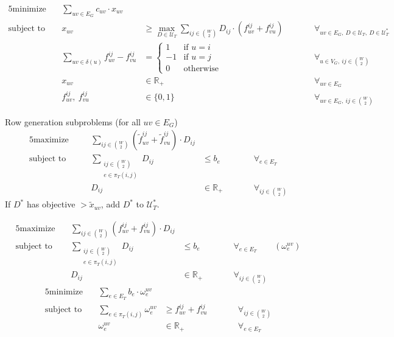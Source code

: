 \begin{alignat*}{5}
    \text{minimize}\ && \sum_{uv \in E_G} c_{uv} \cdot x_{uv} &&& \\
    \text{subject to}\ && x_{uv} &\ge \max_{D \in \mathcal U_T} \sum_{ij \in \binom{W}{2}} D_{ij} \cdot (f_{uv}^{ij} + f_{vu}^{ij}) &&\qquad \forall_{uv \in E_G,\ D \in \mathcal U_T,\ D \in \mathcal U^*_T} \\
    && \sum_{uv \in \delta(u)} f_{uv}^{ij} - f_{vu}^{ij} &= \begin{cases}
                                                                1 & \text{if $u = i$} \\
                                                                -1 & \text{if $u = j$} \\
                                                                0 & \text{otherwise}
    \end{cases} &&\qquad \forall_{u \in V_G,\ ij \in \binom{W}{2}} \\
    && x_{uv} &\in \mathbb{R}_+ &&\qquad \forall_{uv \in E_G} \\
    && f_{uv}^{ij},\ f_{vu}^{ij} &\in \{ 0, 1 \} &&\qquad \forall_{uv \in E_G,\ ij \in \binom{W}{2}}
\end{alignat*}%


Row generation subproblems (for all $uv \in E_G$)
            \begin{alignat*}{5}
                \text{maximize}\quad && \sum_{ij \in \binom{W}{2}} (\tilde f_{uv}^{ij} + \tilde f_{vu}^{ij}) \cdot D_{ij} &&& \\
                \text{subject to}\quad && \sum_{\substack{ij \in \binom{W}{2}\\e \in \pi_T(i,j)}} D_{ij} &\le b_e &&\qquad \forall_{e \in E_T} \\
                && D_{ij} &\in \mathbb{R}_+ &&\qquad \forall_{ij \in \binom{W}{2}}
            \end{alignat*}
            If $D^*$ has objective $> \tilde x_{uv}$, add $D^*$ to $\mathcal U_T^*$.

\begin{alignat*}{5}
    \text{maximize}\ && \sum_{ij \in \binom{W}{2}} (f_{uv}^{ij} + f_{vu}^{ij}) \cdot D_{ij} &&& \\
    \text{subject to}\ && \sum_{\substack{ij \in \binom{W}{2}\\e \in \pi_T(i,j)}} D_{ij} &\le b_e &&\qquad \forall_{e \in E_T} \qquad (\omega_e^{uv}) \\
    && D_{ij} &\in \mathbb{R}_+ &&\qquad \forall_{ij \in \binom{W}{2}}
\end{alignat*}
\hrulefill
\begin{alignat*}{5}
    \text{minimize}\ && \sum_{e \in E_T} b_e \cdot \omega_e^{uv} &&& \\
    \text{subject to}\ && \sum_{e \in \pi_T(i,j)} \omega_e^{uv} &\ge f_{uv}^{ij} + f_{vu}^{ij} &&\qquad \forall_{ij \in \binom{W}{2}} \\
    && \omega_e^{uv} &\in \mathbb{R}_+ &&\qquad \forall_{e \in E_T}
\end{alignat*}

